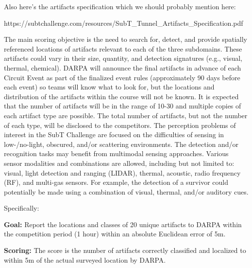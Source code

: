 Also here's the artifacts specification which we should probably mention here:

https://subtchallenge.com/resources/SubT\_Tunnel\_Artifacts\_Specification.pdf

The main scoring objective is the need to search for, detect, and provide spatially referenced
locations of artifacts relevant to each of the three subdomains. These artifacts could vary in their
size, quantity, and detection signatures (e.g., visual, thermal, chemical). DARPA will announce
the final artifacts in advance of each Circuit Event as part of the finalized event rules
(approximately 90 days before each event) so teams will know what to look for, but the locations
and distribution of the artifacts within the course will not be known. It is expected that the number
of artifacts will be in the range of 10-30 and multiple copies of each artifact type are possible. The
total number of artifacts, but not the number of each type, will be disclosed to the competitors.
The perception problems of interest in the SubT Challenge are focused on the difficulties of
sensing in low-/no-light, obscured, and/or scattering environments. The detection and/or
recognition tasks may benefit from multimodal sensing approaches. Various sensor modalities
and combinations are allowed, including but not limited to: visual, light detection and ranging
(LIDAR), thermal, acoustic, radio frequency (RF), and multi-gas sensors. For example, the
detection of a survivor could potentially be made using a combination of visual, thermal, and/or
auditory cues.

Specifically:

\textbf{Goal:} Report the locations and classes of 20 unique artifacts to DARPA within the competition period (1 hour) within an absolute Euclidean error of 5m.

\textbf{Scoring:} The score is the number of artifacts correctly classified and localized to within 5m of the actual surveyed location by DARPA.


